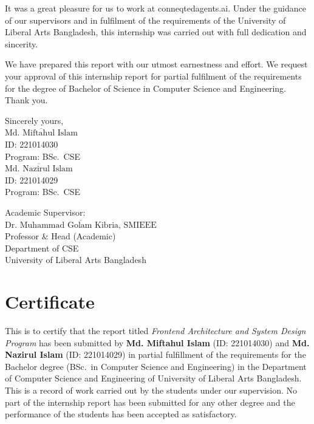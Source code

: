 \documentclass[12pt, oneside, a4paper]{book}
\begin{document}
It was a great pleasure for us to work at conneqtedagents.ai. Under the guidance of our
supervisors and in fulfilment of the requirements of the University of Liberal Arts
Bangladesh, this internship was carried out with full dedication and sincerity.

We have prepared this report with our utmost earnestness and effort. We request your
approval of this internship report for partial fulfilment of the requirements for the
degree of Bachelor of Science in Computer Science and Engineering.\\[0.3cm]

Thank you.\\[1.5cm]

\begin{minipage}[t]{0.45\textwidth}
Sincerely yours,\\[2cm]
$\overline{\text{Md. Miftahul Islam}}$\\
ID: 221014030\\
Program: BSc.\ CSE\\[1.5cm]
$\overline{\text{Md. Nazirul Islam}}$\\
ID: 221014029\\
Program: BSc.\ CSE
\end{minipage}%
\hfill%
\begin{minipage}[t]{0.45\textwidth}
Academic Supervisor:\\[2cm]
$\overline{\text{Dr.\ Muhammad Golam Kibria, SMIEEE}}$\\
Professor \& Head (Academic)\\
Department of CSE\\
University of Liberal Arts Bangladesh
\end{minipage}

\restoregeometry
\cleardoublepage

\thispagestyle{empty}

\section*{Certificate}

This is to certify that the report titled \textit{Frontend Architecture and System Design
Program} has been submitted by \textbf{Md. Miftahul Islam} (ID: 221014030) and
\textbf{Md. Nazirul Islam} (ID: 221014029) in partial fulfillment of the requirements
for the Bachelor degree (BSc.\ in Computer Science and Engineering) in the Department
of Computer Science and Engineering of University of Liberal Arts Bangladesh. This is a
record of work carried out by the students under our supervision. No part of the
internship report has been submitted for any other degree and the performance of the
students has been accepted as satisfactory.\\[1.5cm]
\end{document}
